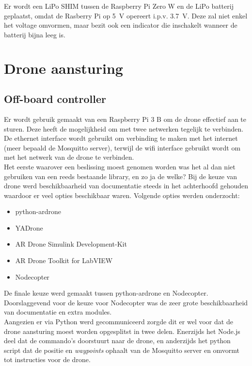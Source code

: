 Er wordt een LiPo SHIM tussen de Raspberry Pi Zero W en de LiPo batterij geplaatst, omdat de Rasberry Pi op \SI{5}{\V} opereert i.p.v. \SI{3.7}{\V}.
Deze zal niet enkel het voltage omvormen, maar bezit ook een indicator die inschakelt wanneer de batterij bijna leeg is.

\section{Drone aansturing} \label{sec:drone_control}
\subsection{Off-board controller} \label{sec:offboard_controller}
Er wordt gebruik gemaakt van een Raspberry Pi 3 B om de drone effectief aan te sturen.
Deze heeft de mogelijkheid om met twee netwerken tegelijk te verbinden.
De ethernet interface wordt gebruikt om verbinding te maken met het internet (meer bepaald de Mosquitto server), terwijl de wifi interface gebruikt wordt om met het netwerk van de drone te verbinden.\\

Het eerste waarover een beslissing moest genomen worden was het al dan niet gebruiken van een reeds bestaande library, en zo ja de welke?
Bij de keuze van drone werd beschikbaarheid van documentatie steeds in het achterhoofd gehouden waardoor er veel opties beschikbaar waren. Volgende opties werden onderzocht:
\begin{itemize}
\item python-ardrone
\item YADrone
\item AR Drone Simulink Development-Kit
\item AR Drone Toolkit for LabVIEW
\item Nodecopter
\end{itemize}

De finale keuze werd gemaakt tussen python-ardrone en Nodecopter. Doorslaggevend voor de keuze voor Nodecopter was de zeer grote beschikbaarheid van documentatie en extra modules.\\

Aangezien er via Python werd gecommuniceerd zorgde dit er wel voor dat de drone aansturing moest worden opgesplitst in twee delen. Enerzijds het Node.js deel dat de commando's doorstuurt naar de drone, en anderzijds het python script dat de positie en \textit{waypoints} ophaalt van de Mosquitto server en omvormt tot instructies voor de drone.

